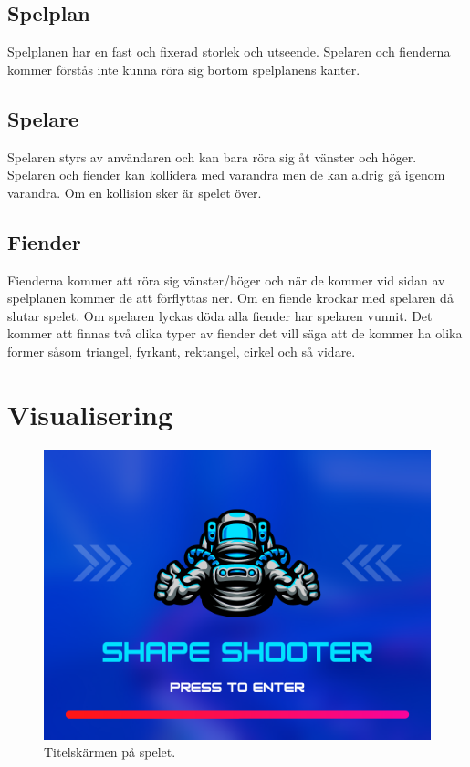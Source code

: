 \documentclass{TDP005mall}
\begin{document}
\subsection{Spelplan}
 Spelplanen har en fast och fixerad storlek och utseende. Spelaren och fienderna kommer förstås inte kunna röra sig bortom spelplanens kanter.

\subsection{Spelare}
 Spelaren styrs av användaren och kan bara röra sig åt vänster och höger. Spelaren och fiender kan kollidera med varandra men de kan aldrig gå igenom varandra. Om en kollision sker är spelet över.

\subsection{Fiender}
 Fienderna kommer att röra sig vänster/höger och när de kommer vid sidan av spelplanen kommer de att förflyttas ner. Om en fiende krockar med spelaren då slutar spelet. Om spelaren lyckas döda alla fiender har spelaren vunnit. Det kommer att finnas två olika typer av fiender det vill säga att de kommer ha olika former såsom triangel, fyrkant, rektangel, cirkel och så vidare.

\newpage

\section{Visualisering}

\begin{figure}[h!]
    \centering
    \includegraphics [scale=0.4] {Kravspecifikation/images/spaceshooter.png}
    \caption{Titelskärmen på spelet.}
\end{figure}
\end{document}
